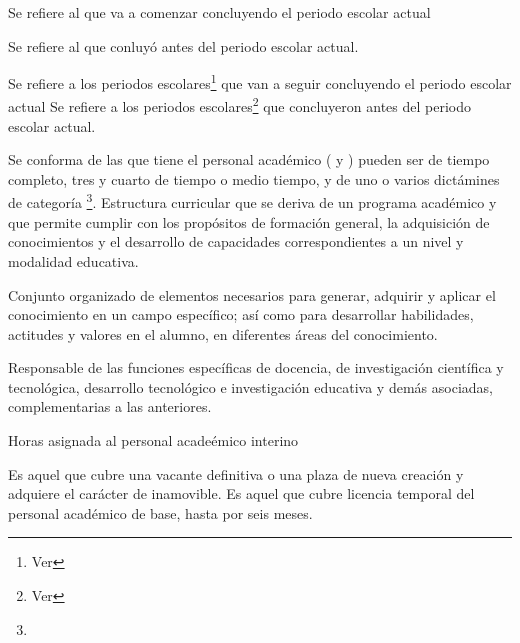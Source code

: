 \begin{bGlosario}
 	 Se refiere al  que va a comenzar concluyendo el periodo escolar actual
 	
 	 Se refiere al  que conluyó antes del periodo escolar actual.

	 Se refiere a los periodos escolares\footnote{Ver } que van a seguir concluyendo el periodo escolar actual
	 Se refiere a los periodos escolares\footnote{Ver } que concluyeron antes del periodo escolar actual.
	
	 Se conforma de las  que tiene el personal académico ( y ) pueden ser de tiempo completo, tres y cuarto de tiempo o medio tiempo, y de uno o varios dictámines de categoría \footnote{ }.
	 Estructura curricular que se deriva de un programa académico y que permite cumplir con los propósitos de formación general, la adquisición de conocimientos y el desarrollo de capacidades correspondientes a un nivel y modalidad educativa.%
	
	 Conjunto organizado de elementos necesarios para generar, adquirir y aplicar	el conocimiento en un campo específico; así como para desarrollar habilidades, actitudes y valores en el alumno, en diferentes áreas del conocimiento. %
	
	 Responsable de las funciones específicas de docencia, de investigación científica y tecnológica, desarrollo tecnológico e investigación educativa y demás asociadas, complementarias a las anteriores.
	
	 Horas asignada al personal acadeémico interino\\
	\begin{Titemize}
		 Es aquel que cubre una vacante definitiva o una plaza de nueva
		creación y adquiere el carácter de inamovible.
		\Titem [Incidencia:] Es aquel que cubre licencia temporal del personal académico de
		base, hasta por seis meses.
	\end{Titemize}
	

\end{bGlosario}
